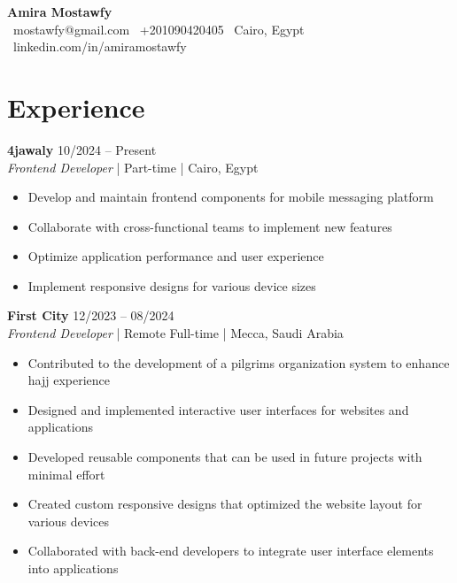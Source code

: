 \documentclass[11pt,a4paper]{article}
\begin{document}
\begin{center}
{\Huge\textbf{Amira Mostawfy}}\\[0.5em]
\faEnvelope\ mostawfy@gmail.com \quad
\faPhone\ +201090420405 \quad
\faMapMarker\ Cairo, Egypt \quad
\faLinkedin\ linkedin.com/in/amiramostawfy
\end{center}

\section*{Experience}

\noindent\textbf{4jawaly} \hfill 10/2024 -- Present\\
\textit{Frontend Developer} | Part-time | Cairo, Egypt\\
\begin{itemize}
    \item Develop and maintain frontend components for mobile messaging platform
    \item Collaborate with cross-functional teams to implement new features
    \item Optimize application performance and user experience
    \item Implement responsive designs for various device sizes
\end{itemize}

\vspace{0.2cm}

\noindent\textbf{First City} \hfill 12/2023 -- 08/2024\\
\textit{Frontend Developer} | Remote Full-time | Mecca, Saudi Arabia\\
\begin{itemize}
    \item Contributed to the development of a pilgrims organization system to enhance hajj experience
    \item Designed and implemented interactive user interfaces for websites and applications
    \item Developed reusable components that can be used in future projects with minimal effort
    \item Created custom responsive designs that optimized the website layout for various devices
    \item Collaborated with back-end developers to integrate user interface elements into applications
\end{itemize}

\vspace{0.2cm}
\end{document}
